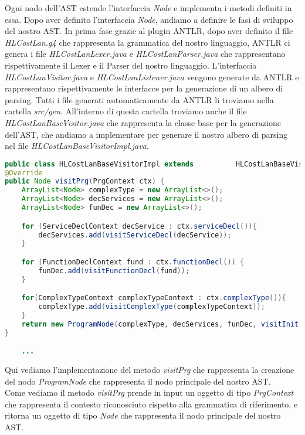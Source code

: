 \documentclass[../../main.tex]{subfiles}
\begin{document}
Ogni nodo dell'AST estende l'interfaccia \textit{Node} e implementa i metodi definiti in essa. 
Dopo aver definito l'interfaccia \textit{Node}, andiamo a definire le fasi di sviluppo del nostro AST.
In prima fase grazie al plugin ANTLR, dopo aver definito il file \textit{HLCostLan.g4} che rappresenta la grammatica del nostro linguaggio, ANTLR ci genera i file \textit{HLCostLanLexer.java} e \textit{HLCostLanParser.java} che rappresentano rispettivamente il Lexer e il Parser del nostro linguaggio. 
L'interfaccia \textit{HLCostLanVisitor.java} e \textit{HLCostLanListener.java} vengono generate da ANTLR e rappresentano rispettivamente le interfacce per la generazione di un albero di parsing. 
Tutti i file generati automaticamente da ANTLR li troviamo nella cartella \textit{src/gen}.
All'interno di questa cartella troviamo anche il file \textit{HLCostLanBaseVisitor.java} che rappresenta la classe base per la generazione dell'AST, che andiamo a implementare per generare il nostro albero di parsing nel file \textit{HLCostLanBaseVisitorImpl.java}.\\
\begin{lstlisting}[language=Java, caption={Implementazione del Visitor AST}] 
public class HLCostLanBaseVisitorImpl extends          HLCostLanBaseVisitor<Node> {
@Override
public Node visitPrg(PrgContext ctx) {
    ArrayList<Node> complexType = new ArrayList<>();
    ArrayList<Node> decServices = new ArrayList<>();
    ArrayList<Node> funDec = new ArrayList<>();

    for (ServiceDeclContext decService : ctx.serviceDecl()){
        decServices.add(visitServiceDecl(decService));
    }

    for (FunctionDeclContext fund : ctx.functionDecl()) {
        funDec.add(visitFunctionDecl(fund));
    }

    for(ComplexTypeContext complexTypeContext : ctx.complexType()){
        complexType.add(visitComplexType(complexTypeContext));
    }
    return new ProgramNode(complexType, decServices, funDec, visitInit(ctx.init()));
}

    ...
\end{lstlisting}
Qui vediamo l'implementazione del metodo \textit{visitPrg} che rappresenta la creazione del nodo \textit{ProgramNode} che rappresenta il nodo principale del nostro AST.\\
Come vediamo il metodo \textit{visitPrg} prende in input un oggetto di tipo \textit{PrgContext} che rappresenta il contesto riconosciuto rispetto alla grammatica di riferimento, e ritorna un oggetto di tipo \textit{Node} che rappresenta il nodo principale del nostro AST.\\
\end{document}
